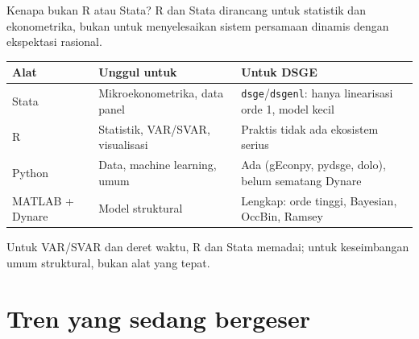 \documentclass[aspectratio=169,11pt]{beamer}
\begin{document}
\begin{frame}{Kenapa bukan R atau Stata?}
R dan Stata dirancang untuk \alert{statistik dan ekonometrika}, bukan untuk
menyelesaikan sistem persamaan dinamis dengan ekspektasi rasional.
\vspace{0.3em}

\centering\footnotesize
\renewcommand{\arraystretch}{1.05}
\begin{tabular}{L{2.3cm} L{3.6cm} L{6.4cm}}
\toprule
Alat & Unggul untuk & Untuk DSGE \\
\midrule
Stata & Mikroekonometrika, data panel & \texttt{dsge}/\texttt{dsgenl}: hanya linearisasi orde 1, model kecil \\
R & Statistik, VAR/SVAR, visualisasi & Praktis tidak ada ekosistem serius \\
Python & Data, machine learning, umum & Ada (gEconpy, pydsge, dolo), belum sematang Dynare \\
MATLAB + Dynare & Model struktural & Lengkap: orde tinggi, Bayesian, OccBin, Ramsey \\
\bottomrule
\end{tabular}

\vspace{0.4em}
\raggedright\footnotesize
Untuk VAR/SVAR dan deret waktu, R dan Stata memadai; untuk keseimbangan umum
struktural, bukan alat yang tepat.
\end{frame}

\section{Tren yang sedang bergeser}
\end{document}
